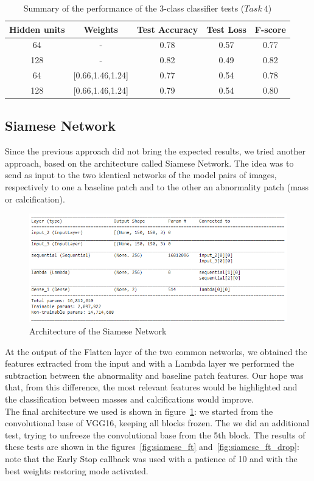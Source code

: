 \documentclass[11pt,a4paper,oneside]{article}
\begin{document}
\begin{table}[h]
\centering
	\begin{tabular}{|cc|ccc|}
	\hline
	Hidden units & Weights & Test Accuracy & Test Loss & F-score \\
	\hline
	64  &	-    		   & 0.78 & 0.57 & 0.77 \\
	128 &	-  			   & 0.82 & 0.49 & 0.82 \\
	64  & [0.66,1.46,1.24] & 0.77 & 0.54 & 0.78 \\
	128 & [0.66,1.46,1.24] & 0.79 & 0.54 & 0.80 \\
	\hline
	\end{tabular}
\caption{Summary of the performance of the 3-class classifier tests ($Task\ 4$)}
\end{table}

\clearpage

\subsection{Siamese Network}
Since the previous approach did not bring the expected results, we tried another approach, based on the architecture called Siamese Network. The idea was to send as input to the two identical networks of the model pairs of images, respectively to one a baseline patch and to the other an abnormality patch (mass or calcification).

\begin{figure}[h]
\centering
\includegraphics[width=.5\textwidth]{images/4.1/Siamese/Model}
\caption{Architecture of the Siamese Network}
\label{fig:siamese_model}
\end{figure}

At the output of the Flatten layer of the two common networks, we obtained the features extracted from the input and with a Lambda layer we performed the subtraction between the abnormality and baseline patch features. Our hope was that, from this difference, the most relevant features would be highlighted and the classification between masses and calcifications would improve. \\
The final architecture we used is shown in figure~\ref{fig:siamese_model}: we started from the convolutional base of VGG16, keeping all blocks frozen. The we did an additional test, trying to unfreeze the convolutional base from the 5th block. The results of these tests are shown in the figures~\ref{fig:siamese_ft} and~\ref{fig:siamese_ft_drop}: note that the Early Stop callback was used with a patience of 10 and with the best weights restoring mode activated.
\end{document}
